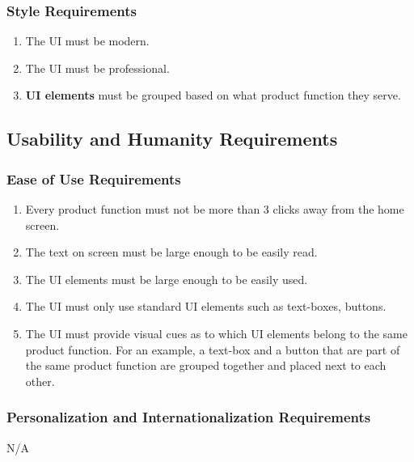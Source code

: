 \documentclass[12pt]{article}
\begin{document}
    \subsubsection{Style Requirements}
    \label{ssub:style_requirements}
    \begin{enumerate}[{LF}1. ]
        \item The UI must be modern.
        \item The UI must be professional.
        \item \textbf{UI elements} must be grouped based on what product function they serve.
    \end{enumerate}
    
    
    \subsection{Usability and Humanity Requirements}
    \label{sub:usability_and_humanity_requirements}
    
    \subsubsection{Ease of Use Requirements}
    \label{ssub:ease_of_use_requirements}
    \begin{enumerate}[{UH}1. ]
        \item Every product function must not be more than 3 clicks away from the home screen.
        \item The text on screen must be large enough to be easily read.
        \item The UI elements must be large enough to be easily used.
        \item The UI must only use standard UI elements such as text-boxes, buttons.
        \item The UI must provide visual cues as to which UI elements belong to the same product function. For an example, a text-box and a button that are part of the same product function are grouped together and placed next to each other.
    \end{enumerate}
    
    \subsubsection{Personalization and Internationalization Requirements}
    \label{ssub:personalization_and_internationalization_requirements}
    N/A
    
\end{document}
